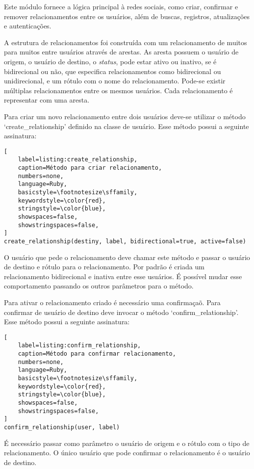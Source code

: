Este módulo fornece a lógica principal à redes sociais, como criar, confirmar e remover relacionamentos entre os usuários, além de buscas, registros, atualizações e autenticações.

A estrutura de relacionamentos foi construída com um relacionamento de muitos para muitos entre usuários através de arestas. As aresta possuem o usuário de origem, o usuário de destino, o \textit{status}, pode estar ativo ou inativo, se é bidirecional ou não, que  especifica relacionamentos como bidirecional ou unidirecional, e um rótulo com o nome do relacionamento. Pode-se existir múltiplas relacionamentos entre os mesmos usuários. Cada relacionamento é representar com uma aresta.

Para criar um novo relacionamento entre dois usuários deve-se utilizar o método `create\_relationship' definido na classe de usuário. Esse método possui a seguinte assinatura:

\begin{lstlisting}[
    label=listing:create_relationship,
    caption=Método para criar relacionamento,
    numbers=none,
    language=Ruby,
    basicstyle=\footnotesize\sffamily,
    keywordstyle=\color{red},
    stringstyle=\color{blue},
    showspaces=false,
    showstringspaces=false,
]
create_relationship(destiny, label, bidirectional=true, active=false)
\end{lstlisting}

O usuário que pede o relacionamento deve chamar este método e passar o usuário de destino e rótulo para o relacionamento. Por padrão é criada um relacionamento bidirecional e inativa entre esse usuários. É possível mudar esse comportamento passando os outros parâmetros para o método.

Para ativar o relacionamento criado é necessário uma confirmaçaõ. Para confirmar de usuário de destino deve invocar o método `confirm\_relationship'. Esse método possui a seguinte assinatura:

\begin{lstlisting}[
    label=listing:confirm_relationship,
    caption=Método para confirmar relacionamento,
    numbers=none,
    language=Ruby,
    basicstyle=\footnotesize\sffamily,
    keywordstyle=\color{red},
    stringstyle=\color{blue},
    showspaces=false,
    showstringspaces=false,
]
confirm_relationship(user, label)
\end{lstlisting}

É necessário passar como parâmetro o usuário de origem e o rótulo com o tipo de relacionamento. O único usuário que pode confirmar o relacionamento é o usuário de destino.

